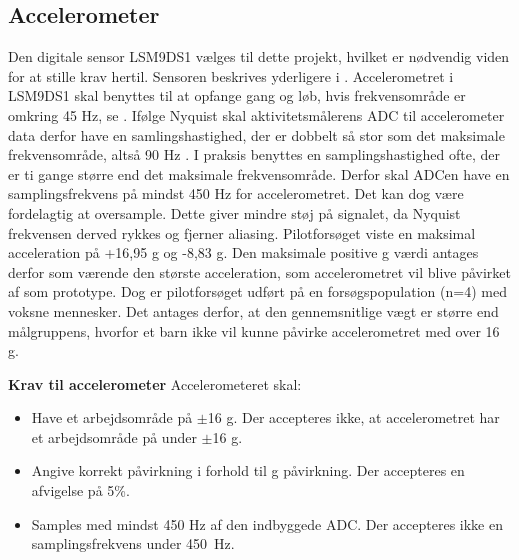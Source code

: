 \subsection{Accelerometer}\label{krav:acc}
Den digitale sensor LSM9DS1 vælges til dette projekt, hvilket er nødvendig viden for at stille krav hertil. Sensoren beskrives yderligere i . Accelerometret i LSM9DS1 skal benyttes til at opfange gang og løb, hvis frekvensområde er omkring 45 Hz, se . Ifølge Nyquist skal aktivitetsmålerens ADC til accelerometer data derfor have en samlingshastighed, der er dobbelt så stor som det maksimale frekvensområde, altså 90 Hz \citep{Webster2011}. I praksis benyttes en samplingshastighed ofte, der er ti gange større end det maksimale frekvensområde. Derfor skal ADCen have en samplingsfrekvens på mindst 450 Hz for accelerometret. Det kan dog være fordelagtig at oversample. Dette giver mindre støj på signalet, da Nyquist frekvensen derved rykkes og fjerner aliasing. \citep{Webster2011} \newline
Pilotforsøget viste en maksimal acceleration på +16,95 g og -8,83 g. Den maksimale positive g værdi antages derfor som værende den største acceleration, som accelerometret vil blive påvirket af som prototype. Dog er pilotforsøget udført på en forsøgspopulation (n=4) med voksne mennesker. Det antages derfor, at den gennemsnitlige vægt er større end målgruppens, hvorfor et barn ikke vil kunne påvirke accelerometret med over 16 g. %

\textbf{Krav til accelerometer} \newline 
Accelerometeret skal:
\begin{itemize}
\item Have et arbejdsområde på $\pm$16 g. Der accepteres ikke, at accelerometret har et arbejdsområde på under $\pm$16 g.
\item Angive korrekt påvirkning i forhold til g påvirkning. Der accepteres en afvigelse på 5\%.
\item Samples med mindst 450 Hz af den indbyggede ADC. Der accepteres ikke en samplingsfrekvens under 450~Hz.
\end{itemize}

